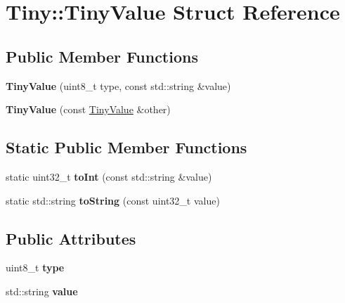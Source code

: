 \hypertarget{structTiny_1_1TinyValue}{\section{Tiny\-:\-:Tiny\-Value Struct Reference}
\label{structTiny_1_1TinyValue}
}
\subsection*{Public Member Functions}
\begin{DoxyCompactItemize}
\item 
\hypertarget{structTiny_1_1TinyValue_ad69d2fc5d019d45696af28669390d3b3}{{\bfseries Tiny\-Value} (uint8\-\_\-t type, const std\-::string \&value)}\label{structTiny_1_1TinyValue_ad69d2fc5d019d45696af28669390d3b3}

\item 
\hypertarget{structTiny_1_1TinyValue_a523631d957d2b2d6399335a7ec66c71e}{{\bfseries Tiny\-Value} (const \hyperlink{structTiny_1_1TinyValue}{Tiny\-Value} \&other)}\label{structTiny_1_1TinyValue_a523631d957d2b2d6399335a7ec66c71e}

\end{DoxyCompactItemize}
\subsection*{Static Public Member Functions}
\begin{DoxyCompactItemize}
\item 
\hypertarget{structTiny_1_1TinyValue_a6949ea147817bc50a9a14761417e122d}{static uint32\-\_\-t {\bfseries to\-Int} (const std\-::string \&value)}\label{structTiny_1_1TinyValue_a6949ea147817bc50a9a14761417e122d}

\item 
\hypertarget{structTiny_1_1TinyValue_a1714ee601feb8a343184406fce3beac5}{static std\-::string {\bfseries to\-String} (const uint32\-\_\-t value)}\label{structTiny_1_1TinyValue_a1714ee601feb8a343184406fce3beac5}

\end{DoxyCompactItemize}
\subsection*{Public Attributes}
\begin{DoxyCompactItemize}
\item 
\hypertarget{structTiny_1_1TinyValue_a353e3a5820e09019550db07020ea1331}{uint8\-\_\-t {\bfseries type}}\label{structTiny_1_1TinyValue_a353e3a5820e09019550db07020ea1331}

\item 
\hypertarget{structTiny_1_1TinyValue_a5e2922ea020075f197dfa247041596f8}{std\-::string {\bfseries value}}\label{structTiny_1_1TinyValue_a5e2922ea020075f197dfa247041596f8}

\end{DoxyCompactItemize}
